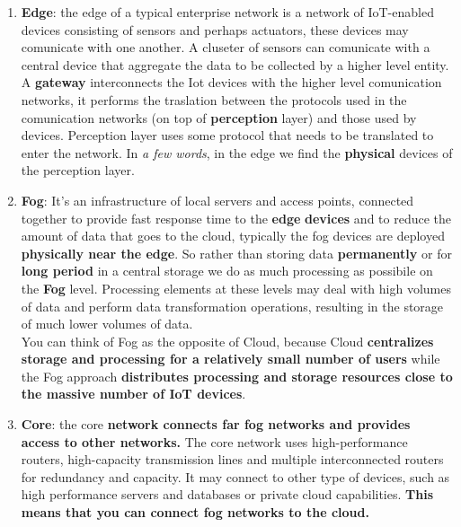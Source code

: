 \documentclass[10pt,a4paper]{report}
\theoremstyle{definition}
\begin{document}
\begin{enumerate}
	
	\item \textbf{Edge}: the edge of a typical enterprise network is a network of IoT-enabled devices consisting of sensors and perhaps actuators, these devices may comunicate with one another. A cluseter of sensors can comunicate with a central device that aggregate the data to be collected by a higher level entity. A \textbf{gateway} interconnects the Iot devices with the higher level comunication networks, it performs the traslation between the protocols used in the comunication networks (on top of \textbf{perception} layer) and those used by devices.
	Perception layer uses some protocol that needs to be translated to enter the network. In \textit{a few words}, in the edge we find the \textbf{physical} devices of the perception layer.
	
	
	
	\item \textbf{Fog}: It's an infrastructure of local servers and access points, connected together to provide fast response time to the  \textbf{edge} \textbf{devices} and to reduce the amount of data that goes to the cloud, typically the fog devices are deployed \textbf{physically near the edge}. So rather than storing data \textbf{permanently} or for \textbf{long period} in a central storage we do as much processing as possibile on the \textbf{Fog} level. Processing elements at these levels may deal with high volumes of data and perform data transformation operations, resulting in the storage of much lower volumes of data.\\
	You can think of Fog as the opposite of Cloud, because Cloud \textbf{centralizes storage and processing for a relatively small number of users} while the Fog approach \textbf{distributes processing and storage resources close to the massive number of IoT devices}.\\
	\item \textbf{Core}: the core \textbf{network connects far fog networks and provides access to other networks.} The core network uses high-performance routers, high-capacity transmission lines and multiple interconnected routers for redundancy and capacity. It may connect to other type of devices, such as high performance servers and databases or private cloud capabilities. \textbf{This means that you can connect fog networks to the cloud.}
	
\end{enumerate}
\end{document}
